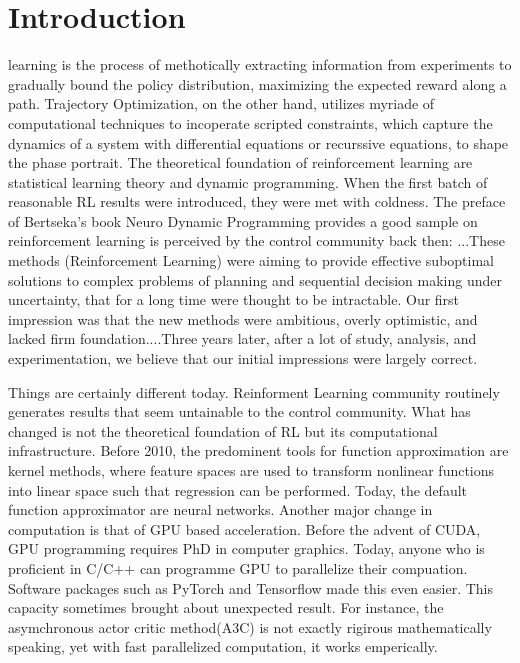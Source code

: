 \documentclass[journal]{IEEEtran}
\begin{document}
\section{Introduction}
 learning is the process of methotically extracting information from experiments to gradually bound the policy distribution, maximizing the expected reward along a path. Trajectory Optimization, on the other hand, utilizes myriade of computational techniques to incoperate scripted constraints, which capture the dynamics of a system with differential equations or recurssive equations, to shape the phase portrait. The theoretical foundation of reinforcement learning are statistical learning theory and dynamic programming. When the first batch of reasonable RL results were introduced, they were met with coldness. The preface of Bertseka's book Neuro Dynamic Programming provides a good sample on reinforcement learning is perceived by the control community back then: ...These methods (Reinforcement Learning) were aiming to provide effective suboptimal solutions to complex problems of planning and sequential decision making under uncertainty, that for a long time were thought to be intractable. Our first impression was that the new methods were ambitious, overly optimistic, and lacked firm foundation....Three years later, after a lot of study, analysis, and experimentation, we believe that our initial impressions were largely correct. \cite{Bertsekas1996NeuroDynamicP}

Things are certainly different today. Reinforment Learning community routinely generates results that seem untainable to the control community. What has changed is not the theoretical foundation of RL but its computational infrastructure. Before 2010, the predominent tools for function approximation are kernel methods, where feature spaces are used to transform nonlinear functions into linear space such that regression can be performed. Today, the default function approximator are neural networks. Another major change in computation is that of GPU based acceleration. Before the advent of CUDA, GPU programming requires PhD in computer graphics. Today, anyone who is proficient in C/C++ can programme GPU to parallelize their compuation. Software packages such as PyTorch and Tensorflow made this even easier. This capacity sometimes brought about unexpected result. For instance, the asymchronous actor critic method(A3C) is not exactly rigirous mathematically speaking, yet with fast parallelized computation, it works emperically.
\end{document}
